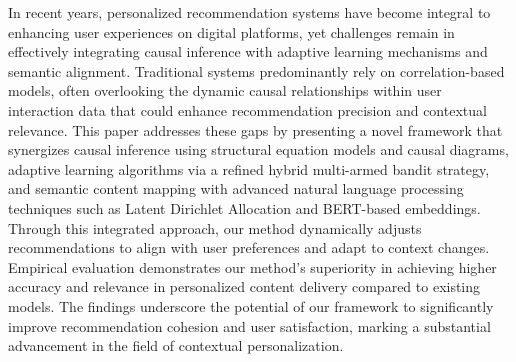 In recent years, personalized recommendation systems have become integral to enhancing user experiences on digital platforms, yet challenges remain in effectively integrating causal inference with adaptive learning mechanisms and semantic alignment. Traditional systems predominantly rely on correlation-based models, often overlooking the dynamic causal relationships within user interaction data that could enhance recommendation precision and contextual relevance. This paper addresses these gaps by presenting a novel framework that synergizes causal inference using structural equation models and causal diagrams, adaptive learning algorithms via a refined hybrid multi-armed bandit strategy, and semantic content mapping with advanced natural language processing techniques such as Latent Dirichlet Allocation and BERT-based embeddings. Through this integrated approach, our method dynamically adjusts recommendations to align with user preferences and adapt to context changes. Empirical evaluation demonstrates our method's superiority in achieving higher accuracy and relevance in personalized content delivery compared to existing models. The findings underscore the potential of our framework to significantly improve recommendation cohesion and user satisfaction, marking a substantial advancement in the field of contextual personalization.
